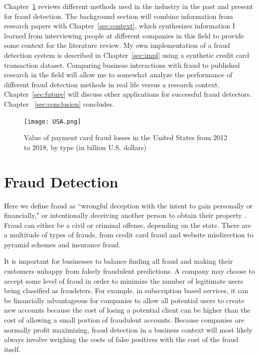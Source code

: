 \documentclass[midd]{thesis}
\begin{document}
Chapter~\ref{sec:background} reviews different methods used in the industry in the past and present for fraud detection. The background section will combine information from research papers with Chapter~\ref{sec:context}, which synthesizes information I learned from interviewing people at different companies in this field to provide some context for the literature review. My own implementation of a fraud detection system is described in Chapter~\ref{sec:impl} using a synthetic credit card transaction dataset. Comparing business interactions with fraud to published research in the field will allow me to somewhat analyze the performance of different fraud detection methods in real life versus a research context. Chapter~\ref{sec:future} will discuss other applications for successful fraud detectors. Chapter ~\ref{sec:conclusion} concludes.

\begin{figure}
  \texttt{[image: USA.png]}
  \caption{Value of payment card fraud losses in the United States from 2012 to 2018, by type (in billion U.S. dollars) \cite{USA}}
  \label{fig:USA}
\end{figure}


\pagebreak

\chapter{Fraud Detection}
\label{sec:background}

Here we define fraud as ``wrongful deception with the intent to gain personally or financially," or intentionally deceiving another person to obtain their property \cite{legaldict}. Fraud can either be a civil or criminal offense, depending on the state. There are a multitude of types of frauds, from credit card fraud and website misdirection to pyramid schemes and insurance fraud. 

It is important for businesses to balance finding all fraud and making their customers unhappy from falsely fraudulent predictions. A company may choose to accept some level of fraud in order to minimize the number of legitimate users being classified as fraudsters. For example, in subscription based services, it can be financially advantageous for companies to allow all potential users to create new accounts because the cost of losing a potential client can be higher than the cost of allowing a small portion of fraudulent accounts. Because companies are normally profit maximizing, fraud detection in a business context will most likely always involve weighing the costs of false positives with the cost of the fraud itself.
\end{document}
